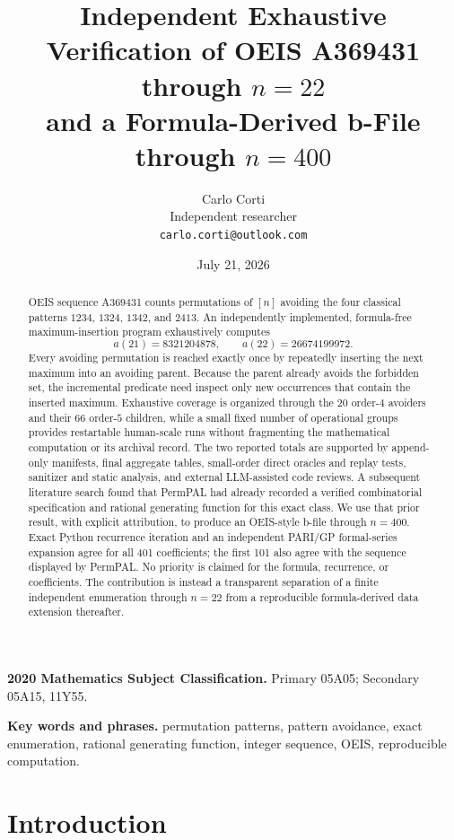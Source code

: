 \documentclass[11pt]{article}
\title{Independent Exhaustive Verification of OEIS A369431 through $n=22$\\
and a Formula-Derived b-File through $n=400$}
\author{Carlo Corti\\
Independent researcher\\
\texttt{carlo.corti@outlook.com}}
\date{July 21, 2026}
\theoremstyle{definition}
\theoremstyle{remark}
\begin{document}
\maketitle

\begin{abstract}
OEIS sequence A369431 counts permutations of $[n]$ avoiding the four
classical patterns $1234$, $1324$, $1342$, and $2413$.  An independently
implemented, formula-free maximum-insertion program exhaustively computes
\[
 a(21)=8321204878,
 \qquad
 a(22)=26674199972.
\]
Every avoiding permutation is reached exactly once by repeatedly inserting
the next maximum into an avoiding parent.  Because the parent already avoids
the forbidden set, the incremental predicate need inspect only new occurrences that
contain the inserted maximum.  Exhaustive coverage is organized through the
20 order-$4$ avoiders and their 66 order-$5$ children, while a small fixed
number of operational groups provides restartable human-scale runs without
fragmenting the mathematical computation or its archival record.  The two
reported totals are supported by append-only manifests, final aggregate
tables, small-order direct oracles and replay tests, sanitizer and static
analysis, and external LLM-assisted code reviews.  A subsequent literature
search found that PermPAL had already recorded a verified combinatorial
specification and rational generating function for this exact class.  We use
that prior result, with explicit attribution, to produce an OEIS-style b-file
through $n=400$.  Exact Python recurrence iteration and an independent
PARI/GP formal-series expansion agree for all 401 coefficients; the first
101 also agree with the sequence displayed by PermPAL.  No priority is claimed
for the formula, recurrence, or coefficients.  The contribution is instead a
transparent separation of a finite independent enumeration through $n=22$
from a reproducible formula-derived data extension thereafter.
\end{abstract}

\noindent\textbf{2020 Mathematics Subject Classification.}
Primary 05A05; Secondary 05A15, 11Y55.

\noindent\textbf{Key words and phrases.}
permutation patterns, pattern avoidance, exact enumeration, rational
generating function, integer sequence, OEIS, reproducible computation.

\section{Introduction}
\label{sec:introduction}
\end{document}
